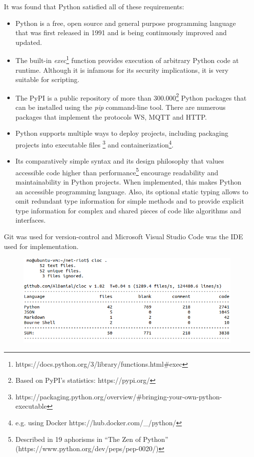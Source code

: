 It was found that Python satisfied all of these requirements:
\begin{itemize}
    \item Python is a free, open source and general purpose programming language that was first released in 1991 and is being continuously improved and updated. %
    \item The built-in \emph{exec}\footnote{https://docs.python.org/3/library/functions.html\#exec} function provides execution of arbitrary Python code at runtime. Although it is infamous for its security implications, it is very suitable for scripting.
    \item The \ac{PyPI} is a public repository of more than 300.000\footnote{Based on \ac{PyPI}'s statistics: https://pypi.org/} Python packages that can be installed using the \emph{pip} command-line tool. There are numerous packages that implement the protocols \ac{WS}, \ac{MQTT} and \ac{HTTP}.
    \item Python supports multiple ways to deploy projects, including packaging projects into executable files \footnote{https://packaging.python.org/overview/\#bringing-your-own-python-executable} and containerization\footnote{e.g. using Docker https://hub.docker.com/\_/python/}.
    \item Its comparatively simple syntax and its design philosophy that values accessible code higher than performance\footnote{Described in 19 aphorisms in \enquote{The Zen of Python} (https://www.python.org/dev/peps/pep-0020/)} encourage readability and maintainability in Python projects. When implemented, this makes Python an accessible programming language. Also, its optional static typing allows to omit redundant type information for simple methods and to provide explicit type information for complex and shared pieces of code like algorithms and interfaces.
\end{itemize} %
Git was used for version-control and Microsoft Visual Studio Code was the \ac{IDE} used for implementation.

\begin{figure}[h]
    \centering
    \includegraphics[width=12cm]{img/ch06/cloc.png}
    \label{fig:cloc}
\end{figure}


